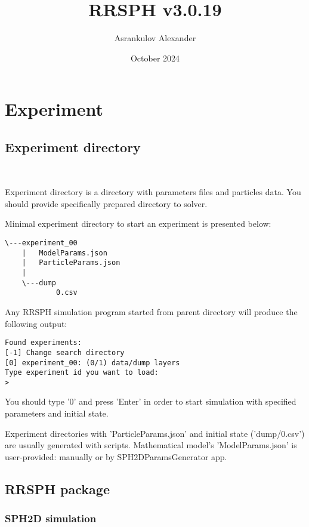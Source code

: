 \documentclass{article}
\title{RRSPH v3.0.19}
\author{Asrankulov Alexander}
\date{October 2024}
\begin{document}
\maketitle

\section{Experiment}

\subsection{Experiment directory}\

Experiment directory is a directory with parameters files and particles data. 
You should provide specifically prepared directory to solver.

Minimal experiment directory to start an experiment is presented below:
\begin{verbatim}
\---experiment_00
    |   ModelParams.json
    |   ParticleParams.json
    |   
    \---dump
            0.csv
\end{verbatim}

Any RRSPH simulation program started from parent directory will produce the following output:
\begin{verbatim}
Found experiments:
[-1] Change search directory
[0] experiment_00: (0/1) data/dump layers
Type experiment id you want to load:
>
\end{verbatim}
You should type '0' and press 'Enter' in order to start simulation with specified parameters and initial state.

Experiment directories with 'ParticleParams.json' and initial state ('dump/0.csv') are usually generated with scripts. Mathematical model's 'ModelParams.json' is user-provided: manually or by SPH2DParamsGenerator app.

\subsection{RRSPH package}

\subsubsection{SPH2D simulation}\
\end{document}
